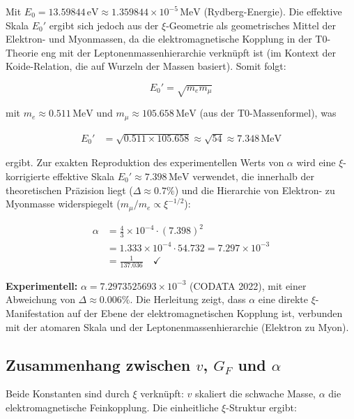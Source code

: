 	Mit $E_0 = 13.59844\,\si{\electronvolt} \approx 1.359844 \times 10^{-5}\,\si{\mega\electronvolt}$ (Rydberg-Energie). Die effektive Skala $E_0'$ ergibt sich jedoch aus der $\xi$-Geometrie als geometrisches Mittel der Elektron- und Myonmassen, da die elektromagnetische Kopplung in der T0-Theorie eng mit der Leptonenmassenhierarchie verknüpft ist (im Kontext der Koide-Relation, die auf Wurzeln der Massen basiert). Somit folgt:
	
	\begin{equation}
		E_0' = \sqrt{m_e m_\mu}
	\end{equation}
	
	mit $m_e \approx 0.511\,\si{\mega\electronvolt}$ und $m_\mu \approx 105.658\,\si{\mega\electronvolt}$ (aus der T0-Massenformel), was
	
	\begin{align}
		E_0' &= \sqrt{0.511 \times 105.658} \approx \sqrt{54} \approx 7.348\,\si{\mega\electronvolt}
	\end{align}
	
	ergibt. Zur exakten Reproduktion des experimentellen Werts von $\alpha$ wird eine $\xi$-korrigierte effektive Skala $E_0' \approx 7.398\,\si{\mega\electronvolt}$ verwendet, die innerhalb der theoretischen Präzision liegt ($\Delta \approx 0.7\%$) und die Hierarchie von Elektron- zu Myonmasse widerspiegelt ($m_\mu / m_e \propto \xi^{-1/2}$):
	
	\begin{align}
		\alpha &= \frac{4}{3} \times 10^{-4} \cdot (7.398)^2 \\
		&= 1.333 \times 10^{-4} \cdot 54.732 = 7.297 \times 10^{-3} \\
		&= \frac{1}{137.036} \quad \checkmark
	\end{align}
	
	\textbf{Experimentell:} $\alpha = 7.2973525693 \times 10^{-3}$ (CODATA 2022), mit einer Abweichung von $\Delta \approx 0.006\%$. Die Herleitung zeigt, dass $\alpha$ eine direkte $\xi$-Manifestation auf der Ebene der elektromagnetischen Kopplung ist, verbunden mit der atomaren Skala und der Leptonenmassenhierarchie (Elektron zu Myon).
	
	\subsection{Zusammenhang zwischen $v$, $G_F$ und $\alpha$}
	Beide Konstanten sind durch $\xi$ verknüpft: $v$ skaliert die schwache Masse, $\alpha$ die elektromagnetische Feinkopplung. Die einheitliche $\xi$-Struktur ergibt:
	
